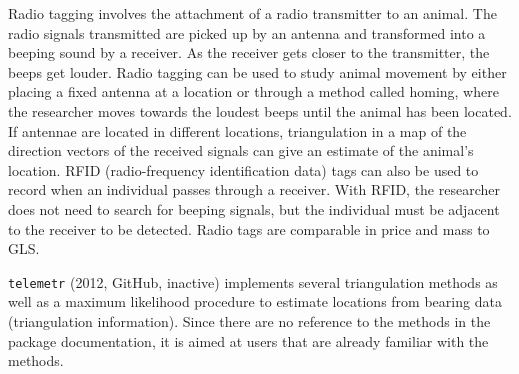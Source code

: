 \documentclass[a4paper,12pt]{article}
\newcommand{\Rpkg}[1]{\texttt{#1}}
\begin{document}
Radio tagging involves the attachment of a radio transmitter to an animal. The radio signals transmitted are picked up by an antenna and transformed into a beeping sound by a receiver. As the receiver gets closer to the transmitter, the beeps get louder. Radio tagging can be used to study animal movement by either placing a fixed antenna at a location or through a method called homing, where the researcher moves towards the loudest beeps until the animal has been located. If antennae are located in different locations, triangulation in a map of the direction vectors of the received signals can give an estimate of the animal's location. RFID (radio-frequency identification data) tags can also be used to record when an individual passes through a receiver. With RFID, the researcher does not need to search for beeping signals, but the individual must be adjacent to the receiver to be detected. Radio tags are comparable in price and mass to GLS.  %
%

\Rpkg{telemetr} (2012, GitHub, inactive) implements several triangulation methods as well as a maximum likelihood procedure to estimate locations from bearing data (triangulation information). Since there are no reference to the methods in the package documentation, it is aimed at users that are already familiar with the methods.
\end{document}
